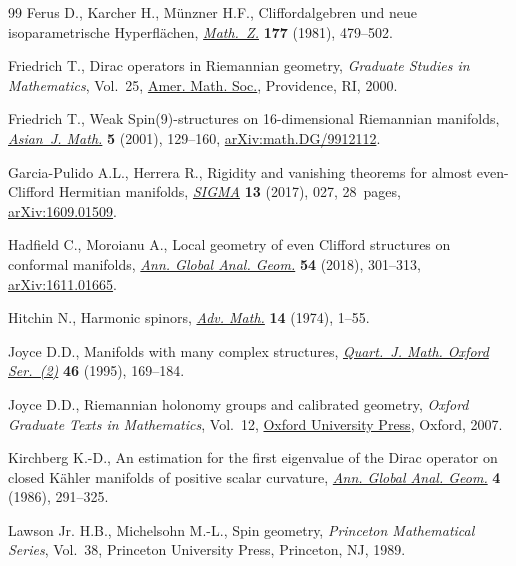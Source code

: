\documentclass[pdftex]{sigma}
\numberwithin{equation}{section}
\begin{document}
\begin{thebibliography}{99}
Ferus D., Karcher H., M\"{u}nzner H.F., Cliffordalgebren und neue
 isoparametrische {H}yperfl\"{a}chen, \href{https://doi.org/10.1007/BF01219082}{\textit{Math.~Z.}} \textbf{177} (1981),
 479--502.

Friedrich T., Dirac operators in {R}iemannian geometry, \textit{Graduate
 Studies in Mathematics}, Vol.~25, \href{https://doi.org/10.1090/gsm/025}{Amer. Math. Soc.}, Providence, RI, 2000.

Friedrich T., Weak {S}pin(9)-structures on 16-dimensional {R}iemannian
 manifolds, \href{https://doi.org/10.4310/AJM.2001.v5.n1.a9}{\textit{Asian~J. Math.}} \textbf{5} (2001), 129--160,
 \href{https://arxiv.org/abs/math.DG/9912112}{arXiv:math.DG/9912112}.

Garcia-Pulido A.L., Herrera R., Rigidity and vanishing theorems for almost
 even-{C}lifford {H}ermitian manifolds, \href{https://doi.org/10.3842/SIGMA.2017.027}{\textit{SIGMA}} \textbf{13} (2017),
 027, 28~pages, \href{https://arxiv.org/abs/1609.01509}{arXiv:1609.01509}.

Hadfield C., Moroianu A., Local geometry of even {C}lifford structures on
 conformal manifolds, \href{https://doi.org/10.1007/s10455-018-9602-8}{\textit{Ann. Global Anal. Geom.}} \textbf{54} (2018),
 301--313, \href{https://arxiv.org/abs/1611.01665}{arXiv:1611.01665}.

Hitchin N., Harmonic spinors, \href{https://doi.org/10.1016/0001-8708(74)90021-8}{\textit{Adv. Math.}} \textbf{14} (1974), 1--55.

Joyce D.D., Manifolds with many complex structures, \href{https://doi.org/10.1093/qmath/46.2.169}{\textit{Quart.~J. Math.
 Oxford Ser.~(2)}} \textbf{46} (1995), 169--184.

Joyce D.D., Riemannian holonomy groups and calibrated geometry, \textit{Oxford
 Graduate Texts in Mathematics}, Vol.~12, \href{https://doi.org/10.1007/978-3-642-19004-9_1}{Oxford University Press}, Oxford,
 2007.

Kirchberg K.-D., An estimation for the first eigenvalue of the {D}irac operator
 on closed {K}\"{a}hler manifolds of positive scalar curvature, \href{https://doi.org/10.1007/BF00128050}{\textit{Ann.
 Global Anal. Geom.}} \textbf{4} (1986), 291--325.

Lawson Jr. H.B., Michelsohn M.-L., Spin geometry, \textit{Princeton Mathematical
 Series}, Vol.~38, Princeton University Press, Princeton, NJ, 1989.


\end{thebibliography}
\end{document}
